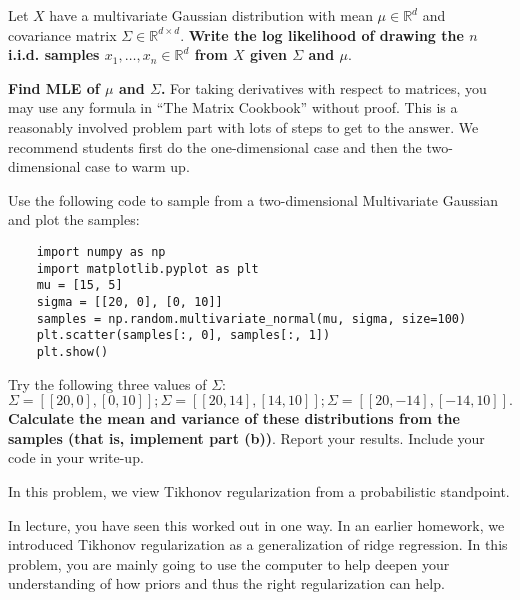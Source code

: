 \begin{Parts}

\Part Let $X$ have a multivariate Gaussian distribution with mean $\mu \in \mathbb{R}^d$ and covariance matrix $\Sigma \in \mathbb{R}^{d \times d}$. \textbf{Write the log likelihood of drawing the $n$ i.i.d. samples $x_1, \ldots, x_n \in \mathbb{R}^d$ from $X$ given $\Sigma$ and $\mu$}.



\Part \textbf{Find MLE of $\mu$ and $\Sigma$.} For taking derivatives
with respect to matrices, you may use any formula in ``The Matrix
Cookbook'' without proof. This is a reasonably involved problem part
with lots of steps to get to the answer. We recommend students first
do the one-dimensional case and then the two-dimensional case to warm 
up. 



\Part Use the following code to sample from a two-dimensional Multivariate Gaussian and plot the samples: 
\begin{verbatim}
	import numpy as np
	import matplotlib.pyplot as plt
	mu = [15, 5]
	sigma = [[20, 0], [0, 10]]
	samples = np.random.multivariate_normal(mu, sigma, size=100)
	plt.scatter(samples[:, 0], samples[:, 1])
	plt.show()
\end{verbatim}
Try the following three values of $\Sigma$:
$$\Sigma = [[20, 0], [0, 10]]; \Sigma = [[20, 14], [14, 10]]; \Sigma = [[20, -14], [-14, 10]].$$
\textbf{Calculate the mean and variance of these distributions from the samples (that is, implement part (b))}. Report your results. Include your code in your write-up.



\end{Parts}
In this problem, we view Tikhonov regularization from a probabilistic
standpoint. 

In lecture, you have seen this worked out in one way. In an earlier
homework, we introduced Tikhonov regularization as a generalization of
ridge regression. In this problem, you are mainly going to use the computer
to help deepen your understanding of how priors and thus the right
regularization can help. 

